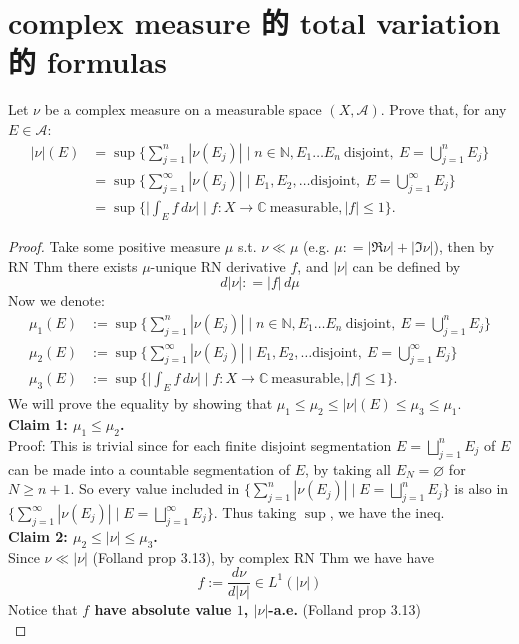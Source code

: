 \documentclass[lang=cn,11pt]{elegantbook}
\begin{document}
\section{complex measure 的 total variation 的 formulas}
  Let $\nu$ be a complex measure on a measurable space $(X,\mathcal{A})$. Prove that, for any $E\in\mathcal{A}$:   \begin{align*}
    |\nu|(E)
    &=\sup\{\sum_{j=1}^n|\nu(E_j)|\mid n\in\mathbb{N}, E_1\dots E_n\ \text{disjoint},\ E=\bigcup_{j=1}^nE_j\}\\
    &=\sup\{\sum_{j=1}^\infty|\nu(E_j)|\mid E_1, E_2,\dots \text{disjoint},\ E=\bigcup_{j=1}^\infty E_j\}\\
    &=\sup\{\big|\int_E f\,d\nu\big|\mid f\colon X\to\mathbb{C}\ \text{measurable}, |f|\le 1\}.
  \end{align*}
\begin{proof}
Take some positive measure $\mu$ s.t.  $\nu \ll \mu$ (e.g. $\mu: =  |\Re \nu | + | \Im \nu |$), then by RN Thm there exists $\mu$-unique RN derivative $f$, and $|\nu|$ can be defined by \[
d |\nu|  : =  |f | \,d \mu
\]
Now we denote: \begin{align*}
    \mu_1(E) &:=\sup\{\sum_{j=1}^n|\nu(E_j)|\mid n\in\mathbb{N}, E_1\dots E_n\ \text{disjoint},\ E=\bigcup_{j=1}^nE_j\}\\
     \mu_2(E) &:=\sup\{\sum_{j=1}^\infty|\nu(E_j)|\mid E_1, E_2,\dots \text{disjoint},\ E=\bigcup_{j=1}^\infty E_j\}\\
    \mu_3(E) &:=\sup\{\big|\int_E f\,d\nu\big|\mid f\colon X\to\mathbb{C}\ \text{measurable}, |f|\le 1\}.
\end{align*}
We will prove the equality by showing that $\mu_1 \leq \mu_2 \leq |\nu|(E) \leq \mu_3  \leq \mu_1$.\\
\textbf{Claim 1: $\mu_1 \leq \mu_2$.}\\
Proof: This is trivial since for each finite disjoint segmentation $E=\bigsqcup_{j=1}^nE_j$ of $E$ can be made into a countable segmentation of $E$, by taking all $E_N = \varnothing$ for $N \geq n+1$. So every value included in $\{\sum_{j=1}^n|\nu(E_j)|\mid E=\bigsqcup_{j=1}^nE_j\}$ is also in $\{\sum_{j=1}^\infty|\nu(E_j)|\mid E=\bigsqcup_{j=1}^\infty E_j\}$. Thus taking $\sup$, we have the ineq.\\
\textbf{Claim 2: $\mu_2 \leq  | \nu | \leq \mu_3$.}\\
Since $\nu \ll |\nu|$ (Folland prop 3.13), by complex RN Thm we have have  $$f:=\frac{d \nu}{d|\nu|} \in L^1(|\nu|)$$
Notice that\textbf{ $f$ have absolute value $1$, $|\nu|$-a.e.} (Folland prop 3.13)\\

\end{proof}
\end{document}
